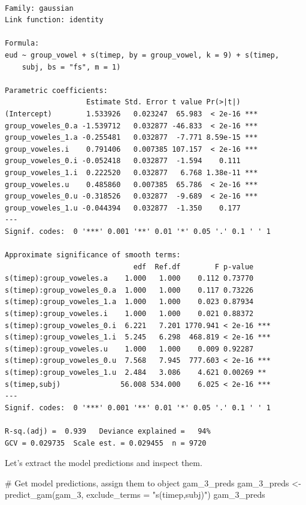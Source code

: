 \documentclass[
  letterpaper,
  DIV=11,
  numbers=noendperiod]{scrartcl}
\newenvironment{Shaded}{\begin{snugshade}}{\end{snugshade}}
\newcommand{\AttributeTok}[1]{\textcolor[rgb]{0.40,0.45,0.13}{#1}}
\newcommand{\CommentTok}[1]{\textcolor[rgb]{0.37,0.37,0.37}{#1}}
\newcommand{\FunctionTok}[1]{\textcolor[rgb]{0.28,0.35,0.67}{#1}}
\newcommand{\NormalTok}[1]{\textcolor[rgb]{0.00,0.23,0.31}{#1}}
\newcommand{\OtherTok}[1]{\textcolor[rgb]{0.00,0.23,0.31}{#1}}
\newcommand{\StringTok}[1]{\textcolor[rgb]{0.13,0.47,0.30}{#1}}
\begin{document}
\begin{verbatim}

Family: gaussian 
Link function: identity 

Formula:
eud ~ group_vowel + s(timep, by = group_vowel, k = 9) + s(timep, 
    subj, bs = "fs", m = 1)

Parametric coefficients:
                   Estimate Std. Error t value Pr(>|t|)    
(Intercept)        1.533926   0.023247  65.983  < 2e-16 ***
group_voweles_0.a -1.539712   0.032877 -46.833  < 2e-16 ***
group_voweles_1.a -0.255481   0.032877  -7.771 8.59e-15 ***
group_voweles.i    0.791406   0.007385 107.157  < 2e-16 ***
group_voweles_0.i -0.052418   0.032877  -1.594    0.111    
group_voweles_1.i  0.222520   0.032877   6.768 1.38e-11 ***
group_voweles.u    0.485860   0.007385  65.786  < 2e-16 ***
group_voweles_0.u -0.318526   0.032877  -9.689  < 2e-16 ***
group_voweles_1.u -0.044394   0.032877  -1.350    0.177    
---
Signif. codes:  0 '***' 0.001 '**' 0.01 '*' 0.05 '.' 0.1 ' ' 1

Approximate significance of smooth terms:
                              edf  Ref.df        F p-value    
s(timep):group_voweles.a    1.000   1.000    0.112 0.73770    
s(timep):group_voweles_0.a  1.000   1.000    0.117 0.73226    
s(timep):group_voweles_1.a  1.000   1.000    0.023 0.87934    
s(timep):group_voweles.i    1.000   1.000    0.021 0.88372    
s(timep):group_voweles_0.i  6.221   7.201 1770.941 < 2e-16 ***
s(timep):group_voweles_1.i  5.245   6.298  468.819 < 2e-16 ***
s(timep):group_voweles.u    1.000   1.000    0.009 0.92287    
s(timep):group_voweles_0.u  7.568   7.945  777.603 < 2e-16 ***
s(timep):group_voweles_1.u  2.484   3.086    4.621 0.00269 ** 
s(timep,subj)              56.008 534.000    6.025 < 2e-16 ***
---
Signif. codes:  0 '***' 0.001 '**' 0.01 '*' 0.05 '.' 0.1 ' ' 1

R-sq.(adj) =  0.939   Deviance explained =   94%
GCV = 0.029735  Scale est. = 0.029455  n = 9720
\end{verbatim}

Let's extract the model predictions and inspect them.

\begin{Shaded}
\begin{Highlighting}[]
\CommentTok{\# Get model predictions, assign them to object \textquotesingle{}gam\_3\_preds\textquotesingle{}}
\NormalTok{gam\_3\_preds }\OtherTok{\textless{}{-}} \FunctionTok{predict\_gam}\NormalTok{(gam\_3, }\AttributeTok{exclude\_terms =} \StringTok{"s(timep,subj)"}\NormalTok{)}
\NormalTok{gam\_3\_preds}
\end{Highlighting}
\end{Shaded}
\end{document}
